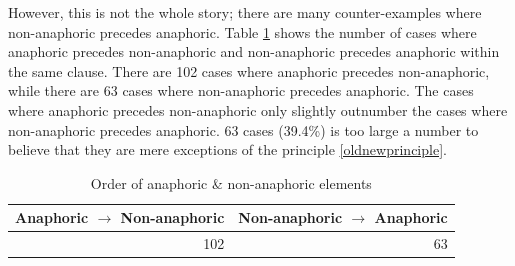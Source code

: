 
However,
this is not the whole story;
there are many counter-examples where non-anaphoric precedes anaphoric.
Table \ref{GNT} shows the number of cases
where anaphoric precedes non-anaphoric and non-anaphoric precedes anaphoric within the same clause.
There are 102 cases where anaphoric precedes non-anaphoric,
while there are 63 cases where non-anaphoric precedes anaphoric.
The cases where anaphoric precedes non-anaphoric only slightly outnumber the cases where non-anaphoric precedes anaphoric.
63 cases (39.4\%) is too large a number to believe that
they are mere exceptions of the principle \ref{oldnewprinciple}.

\begin{table}
\centering
	\caption{Order of anaphoric \& non-anaphoric elements}
\begin{tabular}{rr}
	\toprule
	Anaphoric $\to$ Non-anaphoric & Non-anaphoric $\to$ Anaphoric \\
	\hline
	102 & 63 \\
	\bottomrule
\end{tabular}
	\label{GNT}
\end{table}

